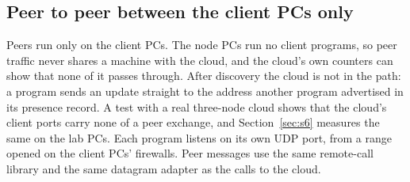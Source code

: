 \subsection{Peer to peer between the client PCs only}
\label{sec:p2ponly}

Peers run only on the client PCs. The node PCs run no client programs, so peer traffic never shares a machine with the cloud, and the cloud's own counters can show that none of it passes through. After discovery the cloud is not in the path: a program sends an update straight to the address another program advertised in its presence record. A test with a real three-node cloud shows that the cloud's client ports carry none of a peer exchange, and Section~\ref{sec:s6} measures the same on the lab PCs. Each program listens on its own UDP port, from a range opened on the client PCs' firewalls. Peer messages use the same remote-call library and the same datagram adapter as the calls to the cloud.

